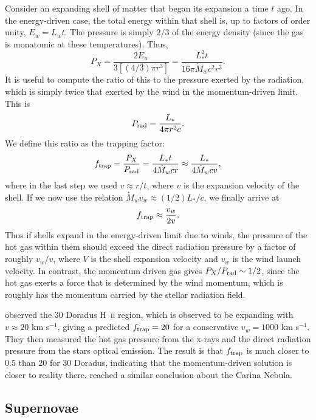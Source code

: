Consider an expanding shell of matter that began its expansion a time $t$ ago. In the energy-driven case, the total energy within that shell is, up to factors of order unity, $E_w = L_w t$. The pressure is simply $2/3$ of the energy density (since the gas is monatomic at these temperatures). Thus,
\begin{equation}
P_X = \frac{2 E_w}{3 [(4/3)\pi r^3]} = \frac{L_*^2 t}{16\pi \dot{M}_w c^2 r^3}.
\end{equation}
It is useful to compute the ratio of this to the pressure exerted by the radiation, which is simply twice that exerted by the wind in the momentum-driven limit. This is
\begin{equation}
P_{\rm rad} = \frac{L_*}{4\pi r^2 c}.
\end{equation}
We define this ratio as the trapping factor:
\begin{equation}
f_{\rm trap} = \frac{P_X}{P_{\rm rad}} = \frac{L_* t}{4\dot{M}_w c r} \approx \frac{L_*}{4\dot{M}_w c v},
\end{equation}
where in the last step we used $v \approx r/t$, where $v$ is the expansion velocity of the shell. If we now use the relation $\dot{M}_w v_w \approx (1/2)L_*/c$, we finally arrive at
\begin{equation}
f_{\rm trap} \approx \frac{v_w}{2v}.
\end{equation}
Thus if shells expand in the energy-driven limit due to winds, the pressure of the hot gas within them should exceed the direct radiation pressure by a factor of roughly $v_w/v$, where $V$ is the shell expansion velocity and $v_w$ is the wind launch velocity. In contrast, the momentum driven gas gives $P_X / P_{\rm rad} \sim 1/2$, since the hot gas exerts a force that is determined by the wind momentum, which is roughly has the momentum carried by the stellar radiation field.

\citet{lopez11a} observed the 30 Doradus H~\textsc{ii} region, which is observed to be expanding with $v\approx 20$ km s$^{-1}$, giving a predicted $f_{\rm trap} = 20$ for a conservative $v_w = 1000$ km s$^{-1}$. They then measured the hot gas pressure from the x-rays and the direct radiation pressure from the stars optical emission. The result is that $f_{\rm trap}$ is much closer to 0.5 than 20 for 30 Doradus, indicating that the momentum-driven solution is closer to reality there. \citet{harper-clark09a} reached a similar conclusion about the Carina Nebula.

\subsection{Supernovae}

